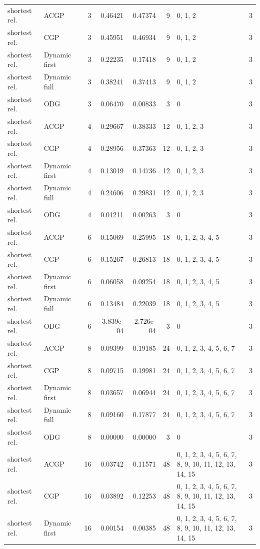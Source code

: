\documentclass[10pt,a4paper]{article}
\begin{document}
\begin{longtable}{@{}p{23mm}p{29mm}rrrrp{36mm}r@{}}
shortest rel. & ACGP & 3 & 0.46421 & 0.47374 & 9 & 0, 1, 2 & 3 \\
shortest rel. & CGP & 3 & 0.45951 & 0.46934 & 9 & 0, 1, 2 & 3 \\
shortest rel. & Dynamic first & 3 & 0.22235 & 0.17418 & 9 & 0, 1, 2 & 3 \\
shortest rel. & Dynamic full & 3 & 0.38241 & 0.37413 & 9 & 0, 1, 2 & 3 \\
shortest rel. & ODG & 3 & 0.06470 & 0.00833 & 3 & 0 & 3 \\
shortest rel. & ACGP & 4 & 0.29667 & 0.38333 & 12 & 0, 1, 2, 3 & 3 \\
shortest rel. & CGP & 4 & 0.28956 & 0.37363 & 12 & 0, 1, 2, 3 & 3 \\
shortest rel. & Dynamic first & 4 & 0.13019 & 0.14736 & 12 & 0, 1, 2, 3 & 3 \\
shortest rel. & Dynamic full & 4 & 0.24606 & 0.29831 & 12 & 0, 1, 2, 3 & 3 \\
shortest rel. & ODG & 4 & 0.01211 & 0.00263 & 3 & 0 & 3 \\
shortest rel. & ACGP & 6 & 0.15069 & 0.25995 & 18 & 0, 1, 2, 3, 4, 5 & 3 \\
shortest rel. & CGP & 6 & 0.15267 & 0.26813 & 18 & 0, 1, 2, 3, 4, 5 & 3 \\
shortest rel. & Dynamic first & 6 & 0.06058 & 0.09254 & 18 & 0, 1, 2, 3, 4, 5 & 3 \\
shortest rel. & Dynamic full & 6 & 0.13484 & 0.22039 & 18 & 0, 1, 2, 3, 4, 5 & 3 \\
shortest rel. & ODG & 6 & 3.839e-04 & 2.726e-04 & 3 & 0 & 3 \\
shortest rel. & ACGP & 8 & 0.09399 & 0.19185 & 24 & 0, 1, 2, 3, 4, 5, 6, 7 & 3 \\
shortest rel. & CGP & 8 & 0.09715 & 0.19981 & 24 & 0, 1, 2, 3, 4, 5, 6, 7 & 3 \\
shortest rel. & Dynamic first & 8 & 0.03657 & 0.06944 & 24 & 0, 1, 2, 3, 4, 5, 6, 7 & 3 \\
shortest rel. & Dynamic full & 8 & 0.09160 & 0.17877 & 24 & 0, 1, 2, 3, 4, 5, 6, 7 & 3 \\
shortest rel. & ODG & 8 & 0.00000 & 0.00000 & 3 & 0 & 3 \\
shortest rel. & ACGP & 16 & 0.03742 & 0.11571 & 48 & 0, 1, 2, 3, 4, 5, 6, 7, 8, 9, 10, 11, 12, 13, 14, 15 & 3 \\
shortest rel. & CGP & 16 & 0.03892 & 0.12253 & 48 & 0, 1, 2, 3, 4, 5, 6, 7, 8, 9, 10, 11, 12, 13, 14, 15 & 3 \\
shortest rel. & Dynamic first & 16 & 0.00154 & 0.00385 & 48 & 0, 1, 2, 3, 4, 5, 6, 7, 8, 9, 10, 11, 12, 13, 14, 15 & 3 \\

\end{longtable}
\end{document}
